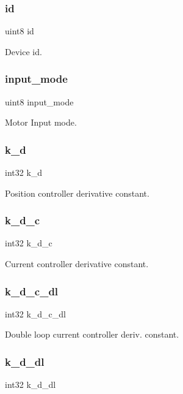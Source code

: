 \subsubsection{id}
{\footnotesize\ttfamily uint8 id}

Device id. \mbox{\label{structst__mem_ae5cc8b2ae06016f1fcf5b2f964618a12}} 
\subsubsection{input\+\_\+mode}
{\footnotesize\ttfamily uint8 input\+\_\+mode}

Motor Input mode. \mbox{\label{structst__mem_ab9d15eaa4612dd1c5597e5634cd1d66c}} 
\subsubsection{k\+\_\+d}
{\footnotesize\ttfamily int32 k\+\_\+d}

Position controller derivative constant. \mbox{\label{structst__mem_af32cf4ebfb30ad068ea530d03ff9a96f}} 
\subsubsection{k\+\_\+d\+\_\+c}
{\footnotesize\ttfamily int32 k\+\_\+d\+\_\+c}

Current controller derivative constant. \mbox{\label{structst__mem_af8bfba55a00d54c9c2a9e4bb11484158}} 
\subsubsection{k\+\_\+d\+\_\+c\+\_\+dl}
{\footnotesize\ttfamily int32 k\+\_\+d\+\_\+c\+\_\+dl}

Double loop current controller deriv. constant. \mbox{\label{structst__mem_adc3d57142df06bc753d1982fa409ffea}} 
\subsubsection{k\+\_\+d\+\_\+dl}
{\footnotesize\ttfamily int32 k\+\_\+d\+\_\+dl}

